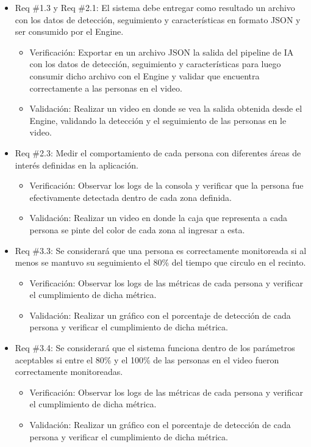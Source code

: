 \documentclass[11pt]{charter}
\begin{document}
\begin{itemize} 
\item Req \#1.3 y Req \#2.1: El sistema debe entregar como resultado un archivo con los datos de detección, seguimiento y características en formato JSON y ser consumido por el Engine.
\begin{itemize}
\item Verificación: Exportar en un archivo JSON la salida del pipeline de IA con los datos de detección, seguimiento y características para luego consumir dicho archivo con el Engine y validar que encuentra correctamente a las personas en el video.
\item Validación: Realizar un video en donde se vea la salida obtenida desde el Engine, validando la detección y el seguimiento de las personas en le video.
\end{itemize}
\end{itemize}

\begin{itemize} 
\item Req \#2.3: Medir el comportamiento de cada persona con diferentes áreas de interés definidas en la aplicación.
\begin{itemize}
\item Verificación: Observar los logs de la consola y verificar que la persona fue efectivamente detectada dentro de cada zona definida.
\item Validación: Realizar un video en donde la caja que representa a cada persona se pinte del color de cada zona al ingresar a esta.
\end{itemize}
\end{itemize}

\begin{itemize} 
\item Req \#3.3: Se considerará que una persona es correctamente monitoreada si al menos se mantuvo su seguimiento el 80\% del tiempo que circulo en el recinto.
\begin{itemize}
\item Verificación: Observar los logs de las métricas de cada persona y verificar el cumplimiento de dicha métrica.
\item Validación: Realizar un gráfico con el porcentaje de detección de cada persona y verificar el cumplimiento de dicha métrica.
\end{itemize}
\end{itemize}

\newpage

\begin{itemize} 
\item Req \#3.4: Se considerará que el sistema funciona dentro de los parámetros aceptables si entre el 80\% y el 100\% de las personas en el video fueron correctamente monitoreadas.
\begin{itemize}
\item Verificación: Observar los logs de las métricas de cada persona y verificar el cumplimiento de dicha métrica.
\item Validación: Realizar un gráfico con el porcentaje de detección de cada persona y verificar el cumplimiento de dicha métrica.
\end{itemize}
\end{itemize}
\end{document}
